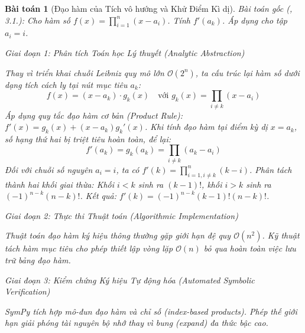 \documentclass{article}
\newtheorem{baitoan}{Bài toán}
\begin{document}

\begin{baitoan}[Đạo hàm của Tích vô hướng và Khử Điểm Kì dị]
 \emph{Bài toán gốc (\cite{Quoc_Long_Dat_Nam_VMC}, 3.1.):} 
 Cho hàm số $f(x) = \prod_{i=1}^n (x - a_i)$. Tính $f'(a_k)$. Áp dụng cho tập $a_i = i$.

\vspace{0.5em}\noindent\emph{Giai đoạn 1: Phân tích Toán học Lý thuyết (Analytic Abstraction)}
 
 Thay vì triển khai chuỗi Leibniz quy mô lớn $\mathcal{O}(2^n)$, ta cấu trúc lại hàm số dưới dạng tích cách ly tại nút mục tiêu $a_k$:
 \begin{equation}
 f(x) = (x - a_k) \cdot g_k(x) \quad \text{với } g_k(x) = \prod_{i \neq k} (x - a_i)
 \end{equation}
 Áp dụng quy tắc đạo hàm cơ bản (Product Rule): $f'(x) = g_k(x) + (x - a_k)g_k'(x)$.
 Khi tính đạo hàm tại điểm kỳ dị $x = a_k$, số hạng thứ hai bị triệt tiêu hoàn toàn, để lại:
 \begin{equation}
 f'(a_k) = g_k(a_k) = \prod_{i \neq k} (a_k - a_i)
 \end{equation}
 Đối với chuỗi số nguyên $a_i = i$, ta có $f'(k) = \prod_{i=1, i \neq k}^n (k - i)$. Phân tách thành hai khối giai thừa:
 Khối $i < k$ sinh ra $(k-1)!$, khối $i > k$ sinh ra $(-1)^{n-k}(n-k)!$. 
 Kết quả: $f'(k) = (-1)^{n-k} (k-1)! (n-k)!$.

\vspace{0.5em}\noindent\emph{Giai đoạn 2: Thực thi Thuật toán (Algorithmic Implementation)}
 
 Thuật toán đạo hàm ký hiệu thông thường gặp giới hạn đệ quy $\mathcal{O}(n^2)$. Kỹ thuật tách hàm mục tiêu cho phép thiết lập vòng lặp $\mathcal{O}(n)$ bỏ qua hoàn toàn việc lưu trữ bảng đạo hàm.



\vspace{0.5em}\noindent\emph{Giai đoạn 3: Kiểm chứng Ký hiệu Tự động hóa (Automated Symbolic Verification)}
 
 \textsf{SymPy} tích hợp mô-đun đạo hàm và chỉ số (index-based products). Phép thế giới hạn giải phóng tài nguyên bộ nhớ thay vì bung (expand) đa thức bậc cao.




\end{baitoan}
\end{document}
